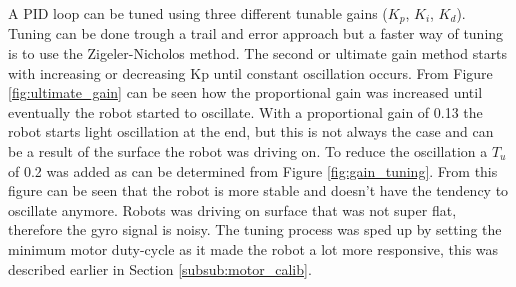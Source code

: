 
A PID loop can be tuned using three different tunable gains ($K_{p}$, $K_{i}$, $K_{d}$).
Tuning can be done trough a trail and error approach but a faster way of tuning is to use the Zigeler-Nicholos method.
The second or ultimate gain method starts with increasing or decreasing Kp until constant oscillation occurs.
From Figure \ref{fig:ultimate_gain} can be seen how the proportional gain was increased until eventually the robot started to oscillate.
With a proportional gain of 0.13 the robot starts light oscillation at the end, but this is not always the case and can be a result of the surface the robot was driving on.
To reduce the oscillation a $T_{u}$ of 0.2 was added as can be determined from Figure \ref{fig:gain_tuning}.
From this figure can be seen that the robot is more stable and doesn't have the tendency to oscillate anymore.
Robots was driving on surface that was not super flat, therefore the gyro signal is noisy.
The tuning process was sped up by setting the minimum motor duty-cycle as it made the robot a lot more responsive, this was described earlier in Section \ref{subsub:motor_calib}.


